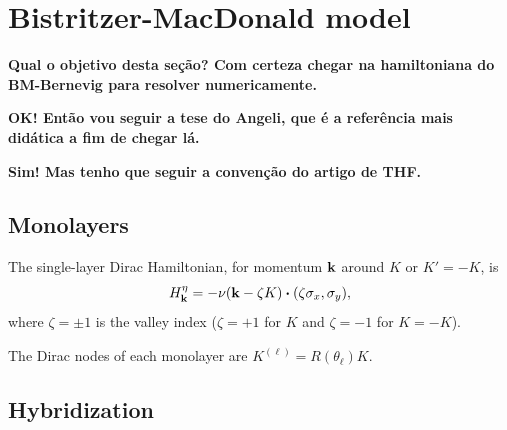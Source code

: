 \section{Bistritzer-MacDonald model} \label{sec:BM-model}

\textbf{Qual o objetivo desta seção? Com certeza chegar na hamiltoniana do BM-Bernevig para resolver numericamente.}

\textbf{OK! Então vou seguir a tese do Angeli, que é a referência mais didática a fim de chegar lá.}

\textbf{Sim! Mas tenho que seguir a convenção do artigo de THF.}

\subsection{Monolayers}

The single-layer Dirac Hamiltonian, for momentum ${\vb{k}}$ around $K$ or $K' = -K$, is
\begin{equation} \label{eq:}
H_\k^\eta = -\nu (\k - \zeta K) \vdot \qty(\zeta \s_x, \s_y),
\end{equation}
where $\zeta = \pm 1$ is the valley index ($\zeta = +1$ for $K$ and $\zeta = -1$ for $K = -K$).

The Dirac nodes of each monolayer are $K^{(\ell)} = R(\theta_\ell) K$.

\subsection{Hybridization}

